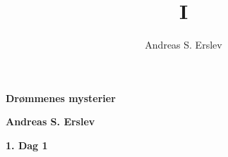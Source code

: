 \documentclass[]{article}
\title{I}
\author{Andreas S. Erslev}
\begin{document}
	
	\begin{center}
		\Large\textbf{Drømmenes mysterier}
	\end{center}
	
	\begin{center}
		\large\textbf{Andreas S. Erslev}
	\end{center}
	
	\begin{center}
	\large\textbf{1. Dag 1}
	\end{center}
	
	
	
	
\end{document}

